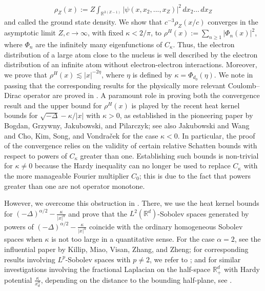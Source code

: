 \documentclass[12pt,reqno]{amsart}
\theoremstyle{definition}
\theoremstyle{remark}
\numberwithin{equation}{section}
\newcommand{\1}{\mathbbm{1}}
\newcommand{\R}{\mathbb{R}}
\begin{document}
\begin{align}
  \rho_Z(x) := Z\int_{\R^{3(Z-1)}}|\psi(x,x_2,...,x_Z)|^2\,dx_2\ldots\,dx_Z
\end{align}
and called the ground state density.
We show that $c^{-3}\rho_Z(x/c)$ converges in the asymptotic limit $Z,c\to\infty$, with fixed $\kappa<2/\pi$, to $\rho^H(x):=\sum_{n\geq1}|\Phi_n(x)|^2$, where $\Phi_n$ are the infinitely many eigenfunctions of $C_\kappa$. Thus, the electron distribution of a large atom close to the nucleus is well described by the electron distribution of an infinite atom without electron-electron interactions. Moreover, we prove that $\rho^H(x)\lesssim|x|^{-2\eta}$, where $\eta$ is defined by $\kappa=\Phi_{d_0}(\eta)$. We note in passing that the corresponding results for the physically more relevant Coulomb--Dirac operator are proved in \cite{MerzSiedentop2022}.
A paramount role in proving both the convergence result and the upper bound for $\rho^H(x)$ is played by the recent heat kernel bounds for $\sqrt{-\Delta}-\kappa/|x|$ with $\kappa>0$, as established in the pioneering paper \cite{Bogdanetal2019} by Bogdan, Grzywny, Jakubowski, and Pilarczyk; see also Jakubowski and Wang \cite{JakubowskiWang2020} and Cho, Kim, Song, and Vondra\v{c}ek \cite{Choetal2020} for the case $\kappa<0$. In particular, the proof of the convergence relies on the validity of certain relative Schatten bounds with respect to powers of $C_\kappa$ greater than one. Establishing such bounds is non-trivial for \(\kappa \neq 0\) because the Hardy inequality can no longer be used to replace \(C_\kappa\) with the more manageable Fourier multiplier \(C_0\); this is due to the fact that powers greater than one are not operator monotone.

However, we overcome this obstruction in \cite{Franketal2021}. There, we use the heat kernel bounds for \( (-\Delta)^{\alpha/2} - \frac{\kappa}{|x|^\alpha} \) and prove that the \( L^2(\mathbb{R}^d) \)-Sobolev spaces generated by powers of \( (-\Delta)^{\alpha/2} - \frac{\kappa}{|x|^\alpha} \) coincide with the ordinary homogeneous Sobolev spaces when \(\kappa\) is not too large in a quantitative sense. For the case \(\alpha = 2\), see the influential paper \cite{Killipetal2018} by Killip, Miao, Visan, Zhang, and Zheng; for corresponding results involving \( L^p \)-Sobolev spaces with \( p \neq 2 \), we refer to \cite{Merz2021,BuiDAncona2023}; and for similar investigations involving the fractional Laplacian on the half-space \( \mathbb{R}_+^d \) with Hardy potential \( \frac{\kappa}{x_d^\alpha} \), depending on the distance to the bounding half-plane, see \cite{FrankMerz2023,BuiMerz2023}.
\end{document}
